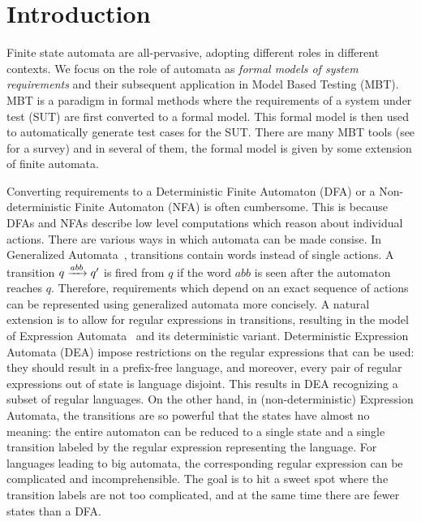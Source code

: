 \section{Introduction}
\label{sec:intro}

  Finite state automata are all-pervasive, adopting different roles in different contexts. We focus on the role of automata as \emph{formal models of system requirements} and their subsequent application in Model Based Testing (MBT). MBT is a paradigm in formal methods where the requirements of a system under test (SUT) are first converted to a formal model. This formal model is then used to automatically generate test cases for the SUT. There are many MBT tools (see \cite{10.1145/1353673.1353681,10.1002/stvr.456} for a survey) and in several of them, the formal model is given by some extension of finite automata. 

  Converting requirements to a Deterministic Finite Automaton (DFA) or a Non-deterministic Finite Automaton (NFA) is often cumbersome. This is because DFAs and NFAs describe low level computations which reason about individual actions. There are various ways in which automata can be made consise. In Generalized Automata~\cite{DBLP:books/lib/Eilenberg76,GIAMMARRESI1999191}, transitions contain words instead of single actions. A transition $q \xrightarrow{abb} q'$ is fired from $q$ if the word $abb$ is seen after the automaton reaches $q$. Therefore, requirements which depend on an exact sequence of actions can be represented using generalized automata more concisely. A natural extension is to allow for regular expressions in transitions, resulting in the model of Expression Automata~\cite{10.1007/978-3-540-30500-2_15} and its deterministic variant. Deterministic Expression Automata (DEA) impose restrictions on the regular expressions that can be used: they should result in a prefix-free language, and moreover, every pair of regular expressions out of state is language disjoint. This results in DEA recognizing a subset of regular languages. On the other hand, in (non-deterministic) Expression Automata, the transitions are so powerful that the states have almost no meaning: the entire automaton can be reduced to a single state and a single transition labeled by the regular expression representing the language. For languages leading to big automata, the corresponding regular expression can be complicated and incomprehensible. The goal is to hit a sweet spot where the transition labels are not too complicated, and at the same time there are fewer states than a DFA. 

